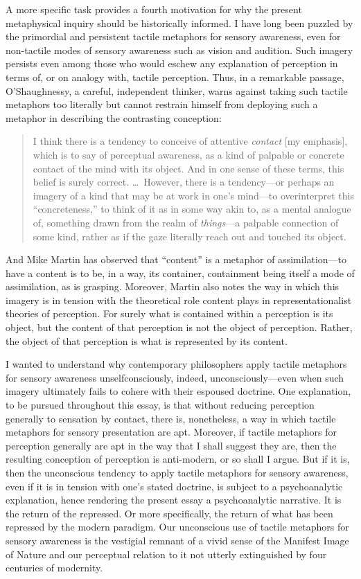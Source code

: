 A more specific task provides a fourth motivation for why the present metaphysical inquiry should be historically informed. I have long been puzzled by the primordial and persistent tactile metaphors for sensory awareness, even for non-tactile modes of sensory awareness such as vision and audition. Such imagery persists even among those who would eschew any explanation of perception in terms of, or on analogy with, tactile perception. Thus, in a remarkable passage, O'Shaughnessy, a careful, independent thinker, warns against taking such tactile metaphors too literally but cannot restrain himself from deploying such a metaphor in describing the contrasting conception:
\begin{quote}
	I think there is a tendency to conceive of attentive \emph{contact} [my emphasis], which is to say of perceptual awareness, as a kind of palpable or concrete contact of the mind with its object. And in one sense of these terms, this belief is surely correct. \ldots\ However, there is a tendency---or perhaps an imagery of a kind that may be at work in one's mind---to overinterpret this ``concreteness,'' to think of it as in some way akin to, as a mental analogue of, something drawn from the realm of \emph{things}---a palpable connection of some kind, rather as if the gaze literally reach out and touched its object. \citep[183]{OShaughnessy:2003eu}
\end{quote}
And Mike Martin has observed that ``content'' is a metaphor of assimilation---to have a content is to be, in a way, its container, containment being itself a mode of assimilation, as is grasping. Moreover, Martin also notes the way in which this imagery is in tension with the theoretical role content plays in representationalist theories of perception. For surely what is contained within a perception is its object, but the content of that perception is not the object of perception. Rather, the object of that perception is what is represented by its content.

I wanted to understand why contemporary philosophers apply tactile metaphors for sensory awareness unselfconsciously, indeed, unconsciously---even when such imagery ultimately fails to cohere with their espoused doctrine. One explanation, to be pursued throughout this essay, is that without reducing perception generally to sensation by contact, there is, nonetheless, a way in which tactile metaphors for sensory presentation are apt. Moreover, if tactile metaphors for perception generally are apt in the way that I shall suggest they are, then the resulting conception of perception is anti-modern, or so shall I argue. But if it is, then the unconscious tendency to apply tactile metaphors for sensory awareness, even if it is in tension with one's stated doctrine, is subject to a psychoanalytic explanation, hence rendering the present essay a psychoanalytic narrative. It is the return of the repressed. Or more specifically, the return of what has been repressed by the modern paradigm. Our unconscious use of tactile metaphors for sensory awareness is the vestigial remnant of a vivid sense of the Manifest Image of Nature and our perceptual relation to it not utterly extinguished by four centuries of modernity.

